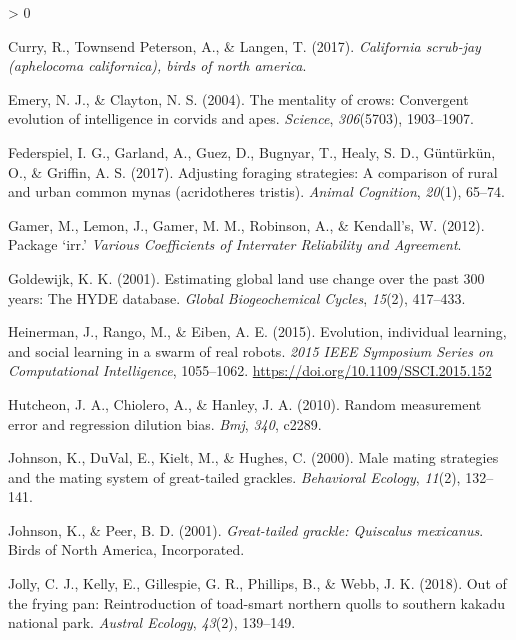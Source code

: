 \documentclass[
]{article}
\newlength{\cslhangindent}
\newenvironment{CSLReferences}[2] %
 {%
  \setlength{\parindent}{0pt}
  \ifodd #1 \everypar{\setlength{\hangindent}{\cslhangindent}}\ignorespaces\fi
  \ifnum #2 > 0
  \setlength{\parskip}{#2\baselineskip}
  \fi
 }%
 {}
\begin{document}
\begin{CSLReferences}{1}{0}
\leavevmode\hypertarget{ref-curry2017california}{}%
Curry, R., Townsend Peterson, A., \& Langen, T. (2017). \emph{California
scrub-jay (aphelocoma californica), birds of north america}.

\leavevmode\hypertarget{ref-emery2004mentality}{}%
Emery, N. J., \& Clayton, N. S. (2004). The mentality of crows:
Convergent evolution of intelligence in corvids and apes.
\emph{Science}, \emph{306}(5703), 1903--1907.

\leavevmode\hypertarget{ref-federspiel2017adjusting}{}%
Federspiel, I. G., Garland, A., Guez, D., Bugnyar, T., Healy, S. D.,
Güntürkün, O., \& Griffin, A. S. (2017). Adjusting foraging strategies:
A comparison of rural and urban common mynas (acridotheres tristis).
\emph{Animal Cognition}, \emph{20}(1), 65--74.

\leavevmode\hypertarget{ref-gamer2012package}{}%
Gamer, M., Lemon, J., Gamer, M. M., Robinson, A., \& Kendall's, W.
(2012). Package {`irr.'} \emph{Various Coefficients of Interrater
Reliability and Agreement}.

\leavevmode\hypertarget{ref-goldewijk2001estimating}{}%
Goldewijk, K. K. (2001). Estimating global land use change over the past
300 years: The HYDE database. \emph{Global Biogeochemical Cycles},
\emph{15}(2), 417--433.

\leavevmode\hypertarget{ref-Heinerman2015robots}{}%
Heinerman, J., Rango, M., \& Eiben, A. E. (2015). Evolution, individual
learning, and social learning in a swarm of real robots. \emph{2015 IEEE
Symposium Series on Computational Intelligence}, 1055--1062.
\url{https://doi.org/10.1109/SSCI.2015.152}

\leavevmode\hypertarget{ref-hutcheon2010random}{}%
Hutcheon, J. A., Chiolero, A., \& Hanley, J. A. (2010). Random
measurement error and regression dilution bias. \emph{Bmj}, \emph{340},
c2289.

\leavevmode\hypertarget{ref-johnson2000male}{}%
Johnson, K., DuVal, E., Kielt, M., \& Hughes, C. (2000). Male mating
strategies and the mating system of great-tailed grackles.
\emph{Behavioral Ecology}, \emph{11}(2), 132--141.

\leavevmode\hypertarget{ref-johnson2001great}{}%
Johnson, K., \& Peer, B. D. (2001). \emph{Great-tailed grackle:
Quiscalus mexicanus}. Birds of North America, Incorporated.

\leavevmode\hypertarget{ref-jolly2018out}{}%
Jolly, C. J., Kelly, E., Gillespie, G. R., Phillips, B., \& Webb, J. K.
(2018). Out of the frying pan: Reintroduction of toad-smart northern
quolls to southern kakadu national park. \emph{Austral Ecology},
\emph{43}(2), 139--149.


\end{CSLReferences}
\end{document}
